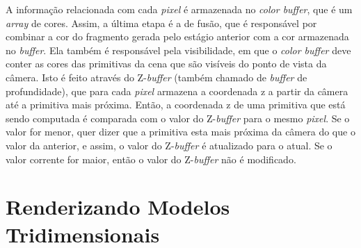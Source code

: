 	 A informação relacionada com cada \textit{pixel} é armazenada no \textit{color buffer}, que é um \textit{array} de cores. Assim, a última etapa é a de fusão, que é responsável por combinar a cor do fragmento gerada pelo estágio anterior com a cor armazenada no \textit{buffer}. Ela também é responsável pela visibilidade, em que o \textit{color buffer} deve conter as cores das primitivas da cena que são visíveis do ponto de vista da câmera. Isto é feito através do Z-\textit{buffer} (também chamado de \textit{buffer} de profundidade), que para cada \textit{pixel} armazena a coordenada z a partir da câmera até a primitiva mais próxima.  Então, a coordenada z de uma primitiva que está sendo computada é comparada com  o valor do Z-\textit{buffer} para o mesmo \textit{pixel}. Se o valor for menor, quer dizer que a primitiva esta mais próxima da câmera do que o valor da anterior, e assim, o valor do Z-\textit{buffer} é atualizado para o atual. Se o valor corrente for maior, então o valor do Z-\textit{buffer} não é modificado. 

\section{Renderizando Modelos Tridimensionais}

